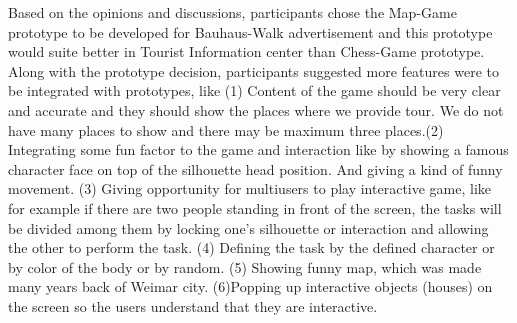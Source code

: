 Based on the opinions and discussions, participants chose the Map-Game prototype to be developed for Bauhaus-Walk advertisement and this prototype would suite better in Tourist Information center than Chess-Game prototype. Along with the prototype decision, participants suggested more features were to be integrated with prototypes, like (1) Content of the game should be very clear and accurate and they should show the places where we provide tour. We do not have many places to show and there may be maximum three places.(2) Integrating some fun factor to the game and interaction like by showing a famous character face on top of the silhouette head position. And giving a kind of funny movement. (3) Giving opportunity for multiusers to play interactive game, like for example if there are two people standing in front of the screen, the tasks will be divided among them by locking one's silhouette or interaction and allowing the other to perform the task. (4) Defining the task by the defined character or by color of the body or by random. (5) Showing funny map, which was made many years back of Weimar city. (6)Popping up interactive objects (houses) on the screen so the users understand that they are interactive. 




